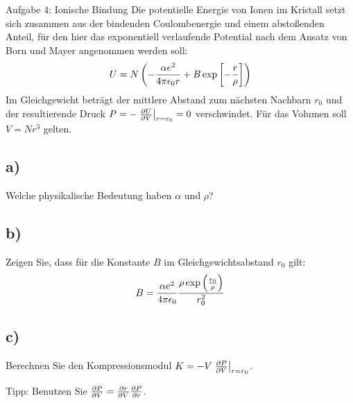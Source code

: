 \begin{aufgabe}{Aufgabe 4: Ionische Bindung}
    Die potentielle Energie von Ionen im Kristall setzt sich zusammen aus der bindenden Coulombenergie und einem abstoßenden Anteil,
    für den hier das exponentiell verlaufende Potential nach dem Ansatz von Born und Mayer angenommen werden soll:
    \[
        U = N \left(-\frac{\alpha e^2}{4\pi\epsilon_0r} + B\exp\left[-\frac{r}{\rho}\right]\right)
    \]
    Im Gleichgewicht beträgt der mittlere Abstand zum nächsten Nachbarn $r_0$ und der resultierende Druck $P = - \left.\frac{\partial U}{\partial V}\right\rvert_{r=r_0} = 0$ verschwindet.
    Für das Volumen soll $V = Nr^3$ gelten.

    \subsection{a)}
    Welche physikalische Bedeutung haben $\alpha$ und $\rho$?

    \subsection{b)}
    Zeigen Sie, dass für die Konstante $B$ im Gleichgewichtsabstand $r_0$ gilt:
    \[
        B = \frac{\alpha e^2}{4\pi\epsilon_0} \frac{\rho\exp\left(\frac{r_0}{\rho}\right)}{r_0^2}
    \]

    \subsection{c)}
    Berechnen Sie den Kompressionsmodul $K = -V \left.\frac{\partial P}{\partial V}\right\rvert_{r=r_0}$.

    Tipp: Benutzen Sie $\frac{\partial P}{\partial V} = \frac{\partial r}{\partial V}\frac{\partial P}{\partial r}$.
\end{aufgabe}

